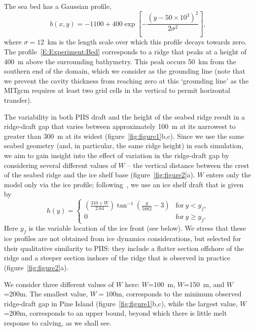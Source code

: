 \documentclass[draft]{agujournal2019}
\begin{document}
The sea bed has a Gaussian profile,
\begin{equation}\label{E:Experiment:Bed}
    b(x,y) = -1100 + 400 \exp\left[-\frac{\left(y - 50\times 10^3\right)^2}{2\sigma^2}\right],
\end{equation}
where $\sigma = 12$~km is the length scale over which this profile decays towards zero. The profile~\eqref{E:Experiment:Bed} corresponds to a ridge that peaks at a height of 400~m above the surrounding bathymetry. This peak occurs 50 km from the southern end of the domain, which we consider as the grounding line (note that we prevent the cavity thickness from reaching zero at this `grounding line' as the MITgcm requires at least two grid cells in the vertical to permit horizontal transfer). 

The variability in both PIIS draft and the height of the seabed ridge result in a ridge-draft gap that varies between approximately 100 m at its narrowest to greater than 300 m at its widest (figure~\ref{fig:figure1}b,c). Since we use the same seabed geometry (and, in particular, the same ridge height) in each simulation, we aim to gain insight into the effect of variation in the ridge-draft gap by considering several different values of $W$ -- the vertical distance between the crest of the seabed ridge and the ice shelf base (figure~\ref{fig:figure2}a). $W$ enters only the model only via the ice profile; following~, we use an ice shelf draft that is given by
\begin{equation}
    h(y) = \begin{cases}
    \left(\frac{310 + W}{2.64}\right)\tan^{-1}\left(\frac{y}{5882} -3\right) & \text{for}~y < y_f,\\
    0  & \text{for}~y \geq y_f.
    \end{cases}
\end{equation}
Here $y_f$ is the variable location of the ice front (see below). We stress that these ice profiles are not obtained from ice dynamics considerations, but selected for their qualitative similarity to PIIS: they include a flatter section offshore of the ridge and a steeper section inshore of the ridge that is observed in practice (figure~\ref{fig:figure2}a).

We consider three different values of $W$ here: $W$=100~m, $W$=150~m, and $W$=200m. The smallest value, $W = 100$m, corresponds to the minimum observed ridge-draft gap in Pine Island (figure~\ref{fig:figure1}b,c), while the largest value, $W$=200m, corresponds to an upper bound, beyond which there is little melt response to calving, as we shall see. 
\end{document}
